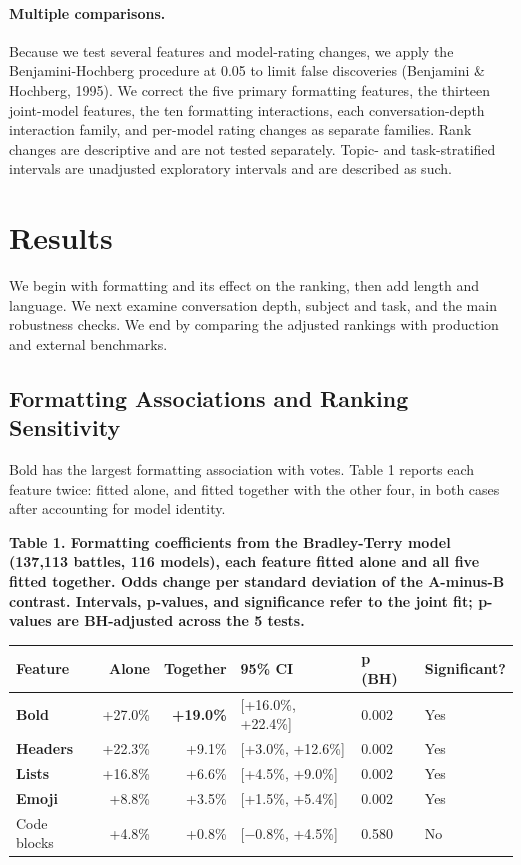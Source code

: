 \documentclass[
]{article}
\newcounter{none} %
\begin{document}
\paragraph{Multiple comparisons.}\label{multiple-comparison-correction}

Because we test several features and model-rating changes, we apply the
Benjamini-Hochberg procedure at 0.05 to limit false discoveries
(Benjamini \& Hochberg, 1995). We correct the five primary formatting
features, the thirteen joint-model features, the ten formatting
interactions, each conversation-depth interaction family, and per-model
rating changes as separate families.
Rank changes are descriptive and are not tested separately. Topic- and
task-stratified intervals are unadjusted exploratory intervals and are
described as such.

\section{Results}\label{results}

We begin with formatting and its effect on the ranking, then add length
and language. We next examine conversation depth, subject and task, and
the main robustness checks. We end by comparing the adjusted rankings
with production and external benchmarks.

\subsection{Formatting Associations and Ranking Sensitivity}\label{formatting-and-votes}

Bold has the largest formatting association with votes. Table 1 reports
each feature twice: fitted alone, and fitted together with the other
four, in both cases after accounting for model identity.

\textbf{Table 1. Formatting coefficients from the Bradley-Terry model
(137,113 battles, 116 models), each feature fitted alone and all five
fitted together. Odds change per standard deviation of the A-minus-B
contrast. Intervals, p-values, and significance refer to the joint fit;
p-values are BH-adjusted across the 5 tests.}

{\def\LTcaptype{none} %
\begin{longtable}[]{@{}lrrlll@{}}
\toprule\noalign{}
Feature & Alone & Together & 95\% CI & p (BH) & Significant? \\
\midrule\noalign{}
\endhead
\bottomrule\noalign{}
\endlastfoot
\textbf{Bold} & +27.0\% & \textbf{+19.0\%} & {[}+16.0\%, +22.4\%{]} &
0.002 & Yes \\
\textbf{Headers} & +22.3\% & +9.1\% & {[}+3.0\%, +12.6\%{]} & 0.002 &
Yes \\
\textbf{Lists} & +16.8\% & +6.6\% & {[}+4.5\%, +9.0\%{]} & 0.002 &
Yes \\
\textbf{Emoji} & +8.8\% & +3.5\% & {[}+1.5\%, +5.4\%{]} & 0.002 &
Yes \\
Code blocks & +4.8\% & +0.8\% & {[}−0.8\%, +4.5\%{]} & 0.580 & No \\
\end{longtable}
}
\end{document}
